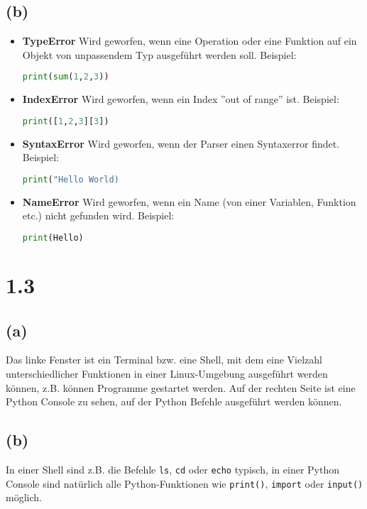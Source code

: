\subsection*{(b)}
\begin{itemize}
    \item \textbf{TypeError} Wird geworfen, wenn eine Operation oder eine Funktion auf ein Objekt von unpassendem Typ ausgeführt werden soll.
    Beispiel:
    \begin{lstlisting}[language=Python]
print(sum(1,2,3))
\end{lstlisting}
    \item \textbf{IndexError} Wird geworfen, wenn ein Index ''out of range'' ist.
    Beispiel:
    \begin{lstlisting}[language=Python]
print([1,2,3][3])
\end{lstlisting}
    \item \textbf{SyntaxError} Wird geworfen, wenn der Parser einen Syntaxerror findet.
    Beispiel:
    \begin{lstlisting}[language=Python]
print("Hello World)
\end{lstlisting}
    \item \textbf{NameError} Wird geworfen, wenn ein Name (von einer Variablen, Funktion etc.) nicht gefunden wird.
    Beispiel:
    \begin{lstlisting}[language=Python]
print(Hello)
\end{lstlisting}
\end{itemize}\cite{python-docs}

\section*{1.3}
\subsection*{(a)}
Das linke Fenster ist ein Terminal bzw. eine Shell, mit dem eine Vielzahl unterschiedlicher Funktionen in einer Linux-Umgebung ausgeführt
werden können, z.B. können Programme gestartet werden.
Auf der rechten Seite ist eine Python Console zu sehen, auf der Python Befehle ausgeführt werden können.
\subsection*{(b)}
In einer Shell sind z.B. die Befehle \verb+ls+, \verb+cd+ oder \verb+echo+ typisch, in einer Python Console sind natürlich
alle Python-Funktionen wie \verb+print()+, \verb+import+ oder \verb+input()+ möglich.

